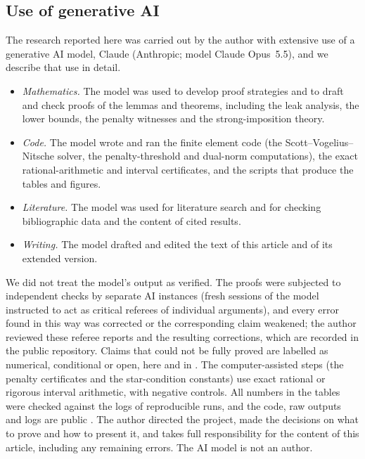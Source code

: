 \documentclass[pdflatex,sn-mathphys-num]{sn-jnl}
\theoremstyle{thmstyleone}
\theoremstyle{thmstylethree}
\begin{document}
\subsection{Use of generative AI}\label{sec:ai}
The research reported here was carried out by the author with extensive use of a generative AI model, Claude (Anthropic; model Claude Opus~5.5), and we describe that use in detail.
\begin{itemize}
\item \emph{Mathematics.} The model was used to develop proof strategies and to draft and check proofs of the lemmas and theorems, including the leak analysis, the lower bounds, the penalty witnesses and the strong-imposition theory.
\item \emph{Code.} The model wrote and ran the finite element code (the Scott--Vogelius--Nitsche solver, the penalty-threshold and dual-norm computations), the exact rational-arithmetic and interval certificates, and the scripts that produce the tables and figures.
\item \emph{Literature.} The model was used for literature search and for checking bibliographic data and the content of cited results.
\item \emph{Writing.} The model drafted and edited the text of this article and of its extended version.
\end{itemize}
We did not treat the model's output as verified. The proofs were subjected to independent checks by separate AI instances (fresh sessions of the model instructed to act as critical referees of individual arguments), and every error found in this way was corrected or the corresponding claim weakened; the author reviewed these referee reports and the resulting corrections, which are recorded in the public repository. Claims that could not be fully proved are labelled as numerical, conditional or open, here and in \cite{PadhiExt}. The computer-assisted steps (the penalty certificates and the star-condition constants) use exact rational or rigorous interval arithmetic, with negative controls. All numbers in the tables were checked against the logs of reproducible runs, and the code, raw outputs and logs are public \cite{ZeroGradRepo}. The author directed the project, made the decisions on what to prove and how to present it, and takes full responsibility for the content of this article, including any remaining errors. The AI model is not an author.
\end{document}
